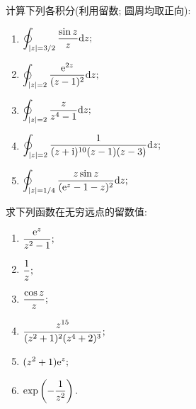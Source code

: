 \begin{yyEx}
	计算下列各积分(利用留数; 圆周均取正向):
	\begin{enumerate}
		\item $\begin{lgathered}
			\oint_{\abs{z} = 3/2} \frac{\sin z}{z} \mathrm{d}z;
		\end{lgathered}$
		\item $\begin{lgathered}
		\oint_{\abs{z} = 2}\frac{\mathrm{e}^{2z}}{(z-1)^2}  \mathrm{d}z;
		\end{lgathered}$
		\item $\begin{lgathered}
		\oint_{\abs{z} = 2}  \frac{z}{z^4-1}\mathrm{d}z;
		\end{lgathered}$
		\item $\begin{lgathered}
		\oint_{\abs{z} = 2}  \frac{1}{(z+\mathrm{i})^{10}(z-1)(z-3)}\mathrm{d}z;
		\end{lgathered}$
		\item $\begin{lgathered}
		\oint_{\abs{z} = 1/4}  \frac{z\sin z}{(\mathrm{e}^z-1-z)^2}\mathrm{d}z;
		\end{lgathered}$
	\end{enumerate}
\end{yyEx}

\begin{yyEx}
	求下列函数在无穷远点的留数值:
	\begin{enumerate}
		\item $\begin{lgathered}
			\frac{\mathrm{e}^z}{z^2-1};
		\end{lgathered}$
		\item $\begin{lgathered}
		\frac{1}{z};
		\end{lgathered}$
		\item $\begin{lgathered}
		\frac{\cos z}{z};
		\end{lgathered}$
		\item $\begin{lgathered}
		\frac{z^{15}}{(z^2+1)^2(z^4+2)^3};
		\end{lgathered}$
		\item $\begin{lgathered}
		(z^2+1)\mathrm{e}^z;
		\end{lgathered}$
		\item $\begin{lgathered}
		\exp\left(-\frac{1}{z^2}\right).
		\end{lgathered}$
	\end{enumerate}
\end{yyEx}

